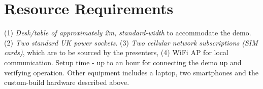 \documentclass{sig-alternate-10pt}
\begin{document}
\section*{Resource Requirements}

(1) \emph{Desk/table of approximately 2m, standard-width} to accommodate the demo. (2) \emph{Two standard UK power sockets}. (3) \emph{Two cellular network subscriptions (SIM cards)}, which are to be sourced by the presenters, (4) WiFi AP for local communication. Setup time - up to an hour for connecting the demo up and verifying operation. Other equipment includes a laptop, two smartphones and the custom-build hardware described above.


{\footnotesize 


}

%
\end{document}
